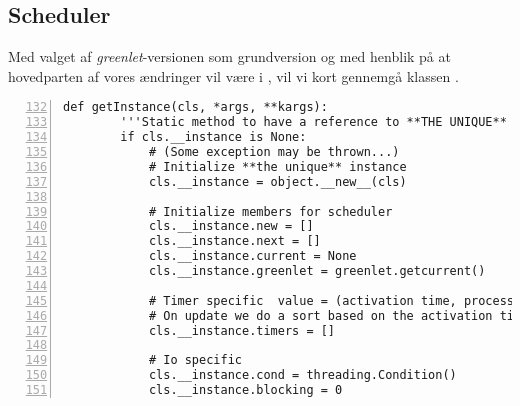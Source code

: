 \subsection{Scheduler}
Med valget af \emph{greenlet}-versionen som grundversion og med henblik på at hovedparten af vores ændringer vil være i \sched, vil vi kort gennemgå klassen .

\begin{lstlisting}[firstnumber=132,stepnumber=5,numbers=left, float, label=fig:scheduling, caption=Uddrag af Scheduler.py i \emph{greenlets}versionen.]
    def getInstance(cls, *args, **kargs):
        '''Static method to have a reference to **THE UNIQUE** instance'''
        if cls.__instance is None:
            # (Some exception may be thrown...)
            # Initialize **the unique** instance
            cls.__instance = object.__new__(cls)

            # Initialize members for scheduler
            cls.__instance.new = []
            cls.__instance.next = []
            cls.__instance.current = None
            cls.__instance.greenlet = greenlet.getcurrent()

            # Timer specific  value = (activation time, process)
            # On update we do a sort based on the activation time
            cls.__instance.timers = []

            # Io specific
            cls.__instance.cond = threading.Condition()
            cls.__instance.blocking = 0
\end{lstlisting}

